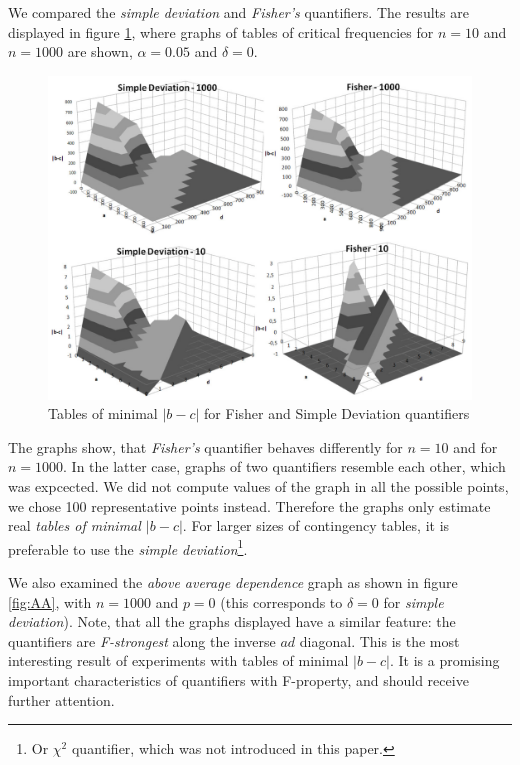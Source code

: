We compared the \emph{simple deviation} and \emph{Fisher's} quantifiers.
The results are displayed in figure \ref{fig:FProperty}, where graphs of tables of critical frequencies for $n=10$ and $n=1000$ are shown, $\alpha=0.05$ and $\delta=0$.

\begin{figure}[ht]
\centering
\includegraphics[width=115mm]{SDFisher.eps}
\caption{Tables of minimal $|b-c|$ for Fisher and Simple Deviation quantifiers}
\label{fig:FProperty}
\end{figure}

The graphs show, that \emph{Fisher's} quantifier behaves differently for $n=10$ and for $n=1000$. In the latter case, graphs of two quantifiers resemble each other, which was expcected. We did not compute values of the graph in all the possible points, we chose 100 representative points instead. Therefore the graphs only estimate real \emph{tables of minimal $|b-c|$}. For larger sizes of contingency tables, it is preferable to use the \emph{simple deviation}\footnote{Or $\chi^{2}$ quantifier, which was not introduced in this paper.}. 

We also examined the \emph{above average dependence} graph as shown in figure \ref{fig:AA}, with $n=1000$ and $p=0$ (this corresponds to $\delta=0$ for \emph{simple deviation}). Note, that all the graphs displayed have a similar feature: the quantifiers are \emph{F-strongest} along the inverse $ad$ diagonal. This is the most interesting result of experiments with tables of minimal $|b-c|$. It is a promising important characteristics of quantifiers with F-property, and should receive further attention. 


